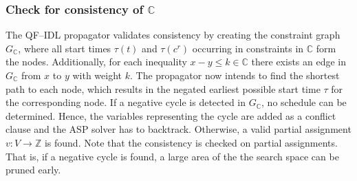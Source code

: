 \subsubsection{Check for consistency of $\mathbb{C}$}
\label{par:consistency}
The QF--IDL propagator validates consistency by creating the constraint graph $G_\mathbb{C}$, 
where all start times $\tau(t)$ and $\tau(c^r)$ occurring in constraints in $\mathbb{C}$ form the nodes.
Additionally, for each inequality $x-y\leq k\in \mathbb{C}$ there exists an edge in $G_\mathbb{C}$ from $x$ to $y$ with weight $k$. 
The propagator now intends to find the shortest path to each node, which results in the negated earliest possible start time $\tau$ for the corresponding node.
If a negative cycle is detected in $G_\mathbb{C}$, no schedule can be determined. Hence, the variables representing the cycle are added as a conflict clause and the ASP solver has to backtrack.
Otherwise, a valid partial assignment $v:V\rightarrow \mathbb{Z}$ is found. Note that the consistency is checked on partial assignments. That is, if a negative cycle is found, a large area of the the search space can be pruned early. 
